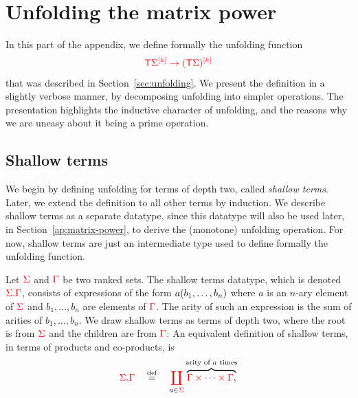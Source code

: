 \section{Unfolding the matrix power} 
\label{sec:appendix-unfold}
In this part of the appendix, we define formally the unfolding function
\begin{align*}
    \ranked{\tmonad \mati k{\Sigma} \to \mati k{( \tmonad \Sigma)}}
\end{align*}
that was described in Section~\ref{sec:unfolding}. We  present the definition in a slightly verbose manner,  by  decomposing unfolding into simpler operations. The  presentation highlights the inductive character of unfolding, and the reasons why we are uneasy about it being a prime operation. 



\subsection{Shallow terms}
\label{sec:shallow-terms}
We begin by defining unfolding  for terms of depth two, called \emph{shallow terms}. Later, we extend the definition to all other terms by induction. 
We describe shallow terms as a separate datatype, since this datatype will also be used later, in Section~\ref{ap:matrix-power}, to derive the (monotone) unfolding operation.
 For now, shallow terms are just an intermediate type used to define formally the unfolding function. 

 Let $\rSigma$ and $\rGamma$ be two ranked sets. The  shallow terms datatype, which is  denoted $\shallowterm \rSigma \rGamma$, consists of  expressions of the form $a\tensorpair{b_1,\dots,b_n}$ where $a$ is an $n$-ary element of $\rSigma$ and $b_1,\dots, b_n$ are elements of $\rGamma$. The arity of such an expression is the sum of arities of $b_1,\ldots,b_n$. We draw shallow terms as terms of depth two, where the root is from $\rSigma$ and  the children are from $\rGamma$:
An equivalent definition of shallow terms, in terms of products and co-products, is 
\begin{align}\label{eq:shallowterm-definition}
\shallowterm \rSigma \rGamma \quad \eqdef   \quad \ranked{\coprod_{\black{a \in} \rSigma} } \overbrace{\ranked{\Gamma \product \cdots \product \Gamma},}^{\text{arity of $a$ times}}
\end{align}


